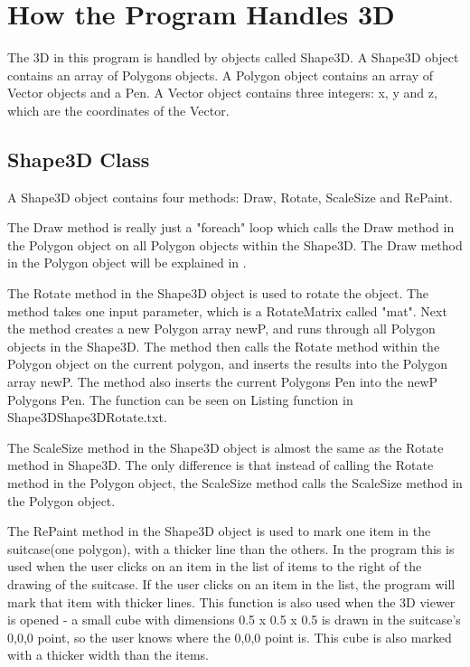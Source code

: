 \section{How the Program Handles 3D}
\label{3DHandler}
The 3D in this program is handled by objects called Shape3D. A Shape3D object contains an array of Polygons objects. A Polygon object contains an array of Vector objects and a Pen. A Vector object contains three integers: x, y and z, which are the coordinates of the Vector. 

\subsection{Shape3D Class}
A Shape3D  object contains four methods: Draw, Rotate, ScaleSize and RePaint. 

The Draw method is really just a "foreach" loop which calls the Draw method in the Polygon object on all Polygon objects within the Shape3D. The Draw method in the Polygon object will be explained in .\newline

The Rotate method in the Shape3D object is used to rotate the object. The method takes one input parameter, which is a RotateMatrix called "mat". Next the method creates a new Polygon array newP, and runs through all Polygon objects in the Shape3D. The method then calls the Rotate method within the Polygon object on the current polygon, and inserts the results into the Polygon array newP. The method also inserts the current Polygons Pen into the newP Polygons Pen. The function can be seen on Listing  {function in Shape3D}{Shape3DRotate.txt}.

The ScaleSize method in the Shape3D object is almost the same as the Rotate method in Shape3D. The only difference is that instead of calling the Rotate method in the Polygon object, the ScaleSize method calls the ScaleSize method in the Polygon object.  

The RePaint method in the Shape3D object is used to mark one item in the suitcase(one polygon), with a thicker line than the others. In the program this is used when the user clicks on an item in the list of items to the right of the drawing of the suitcase. If the user clicks on an item in the list, the program will mark that item with thicker lines. This function is also used when the 3D viewer is opened - a small cube with dimensions 0.5 x 0.5 x 0.5 is drawn in the suitcase's 0,0,0 point, so the user knows where the 0,0,0 point is. This cube is also marked with a thicker width than the items.

